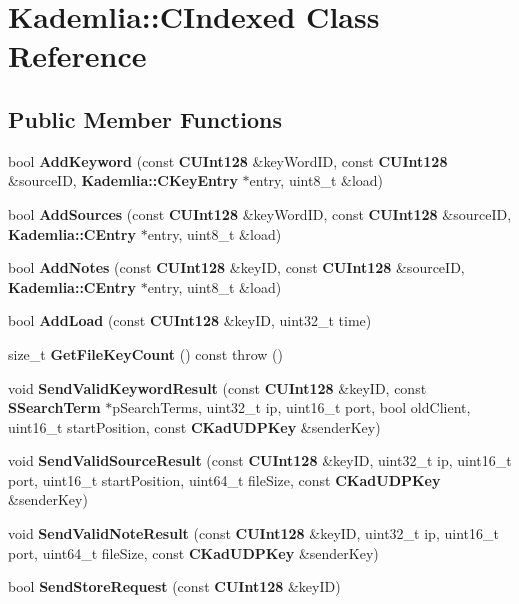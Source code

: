 \section{Kademlia::CIndexed Class Reference}
\label{classKademlia_1_1CIndexed}
\subsection*{Public Member Functions}
\begin{DoxyCompactItemize}
\item 
bool {\bfseries AddKeyword} (const {\bf CUInt128} \&keyWordID, const {\bf CUInt128} \&sourceID, {\bf Kademlia::CKeyEntry} $\ast$entry, uint8\_\-t \&load)\label{classKademlia_1_1CIndexed_a0403f879023918be5218fd8a9b1aa803}

\item 
bool {\bfseries AddSources} (const {\bf CUInt128} \&keyWordID, const {\bf CUInt128} \&sourceID, {\bf Kademlia::CEntry} $\ast$entry, uint8\_\-t \&load)\label{classKademlia_1_1CIndexed_a4e8ce472633ceaf61035529ff9023e7b}

\item 
bool {\bfseries AddNotes} (const {\bf CUInt128} \&keyID, const {\bf CUInt128} \&sourceID, {\bf Kademlia::CEntry} $\ast$entry, uint8\_\-t \&load)\label{classKademlia_1_1CIndexed_ad73d3a913e96f802c2fabe73f4afb8fb}

\item 
bool {\bfseries AddLoad} (const {\bf CUInt128} \&keyID, uint32\_\-t time)\label{classKademlia_1_1CIndexed_aadaff6df606cc1a345bcb9623d63e894}

\item 
size\_\-t {\bfseries GetFileKeyCount} () const   throw ()\label{classKademlia_1_1CIndexed_ae6e78ac19a2f4ab566ddf0440d4c10fb}

\item 
void {\bfseries SendValidKeywordResult} (const {\bf CUInt128} \&keyID, const {\bf SSearchTerm} $\ast$pSearchTerms, uint32\_\-t ip, uint16\_\-t port, bool oldClient, uint16\_\-t startPosition, const {\bf CKadUDPKey} \&senderKey)\label{classKademlia_1_1CIndexed_ad6ac3c2bbf537b75c4b937b7d69bf49a}

\item 
void {\bfseries SendValidSourceResult} (const {\bf CUInt128} \&keyID, uint32\_\-t ip, uint16\_\-t port, uint16\_\-t startPosition, uint64\_\-t fileSize, const {\bf CKadUDPKey} \&senderKey)\label{classKademlia_1_1CIndexed_a391c26034714db981e4acc8e392fe005}

\item 
void {\bfseries SendValidNoteResult} (const {\bf CUInt128} \&keyID, uint32\_\-t ip, uint16\_\-t port, uint64\_\-t fileSize, const {\bf CKadUDPKey} \&senderKey)\label{classKademlia_1_1CIndexed_a2de26ab5097fe3e87cdce520738883c7}

\item 
bool {\bfseries SendStoreRequest} (const {\bf CUInt128} \&keyID)\label{classKademlia_1_1CIndexed_ad4a82a5a72068304b738c67db48b0c0a}

\end{DoxyCompactItemize}

